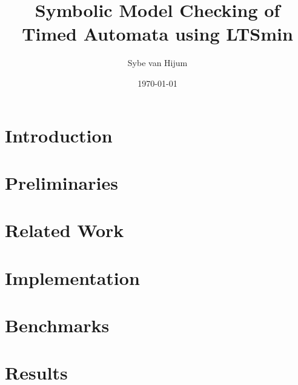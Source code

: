 \documentclass[11pt,a4paper]{article}
\newcommand{\ltsmin}{LTSmin}
\begin{document}
\newtheorem{mydef}{Definition}
\newtheorem{myconjecture}{Conjecture}
\title{Symbolic Model Checking of Timed Automata using \ltsmin{}}
\author{Sybe van Hijum}
\date{\today{}}
\maketitle

\clearpage
\tableofcontents

\clearpage
\section{Introduction}


%

\clearpage
\section{Preliminaries}


\clearpage
\section{Related Work}


\clearpage
\section{Implementation}


%

%

\clearpage
\section{Benchmarks}


\clearpage
\section{Results}


\clearpage
{}

\end{document}
